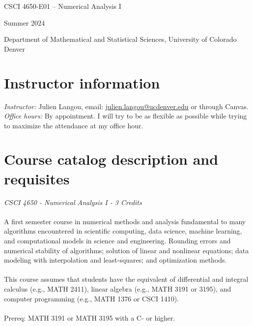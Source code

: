 \documentclass[letterpaper,10pt]{article}
\newcommand{\mailto}[1]{\href{mailto:#1}{#1}}
\begin{document}
\begin{center}{\LARGE
CSCI 4650-E01 -- Numerical Analysis I
}
\bigskip

Summer 2024


Department of Mathematical and Statistical Sciences, University of Colorado Denver
\end{center}\vspace*{-1em}


\section*{Instructor information}

\emph{Instructor:} Julien Langou,
email: \mailto{julien.langou@ucdenver.edu} or through Canvas.\\

\emph{Office hours:} By appointment. I will try to be as
flexible as possible while trying to maximize the attendance at my office hour.\\

\medskip

\section*{Course catalog description and requisites}


\emph{CSCI 4650 -  Numerical Analysis I - 3 Credits}\\
\\
A first semester course in numerical methods and analysis fundamental to many
algorithms encountered in scientific computing, data science, machine learning,
and computational models in science and engineering. Rounding errors and
numerical stability of algorithms; solution of linear and nonlinear equations;
data modeling with interpolation and least-squares; and optimization methods.\\
\\
This course assumes that students have the equivalent of differential and
integral calculus (e.g., MATH 2411), linear algebra (e.g., MATH 3191 or 3195),
and computer programming (e.g., MATH 1376 or CSCI 1410).\\
\\
Prereq: MATH 3191 or MATH 3195 with a C- or higher.\\ 
\\
\end{document}
